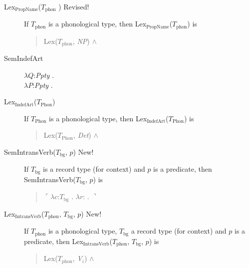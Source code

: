 \begin{description}
\item[\textnormal{Lex$_{\mathrm{PropName}}$($T_{\mathrm{phon}}$
    )} Revised!] \mbox{}

  If $T_{\mathrm{phon}}$ is a phonological type,
  then Lex$_{\mathrm{PropName}}$($T_{\mathrm{phon}}$) is
  \begin{quote}
    Lex($T_{\mathrm{phon}}$, \textit{NP}) \d{$\wedge$}
  \end{quote}

  
\item[\textnormal{SemIndefArt}] \mbox{}

  $\lambda Q$:\textit{Ppty} . \\
\hspace*{1em} $\lambda P$:\textit{Ppty}
. 

        
      \item[\textnormal{Lex$_{\mathrm{IndefArt}}$($T_{\mathrm{Phon}}$)}]
        \mbox{}

        If $T_{\mathrm{Phon}}$ is a phonological type, then
        Lex$_{\mathrm{IndefArt}}$($T_{\mathrm{Phon}}$) is
        \begin{quote}
          Lex($T_{\mathrm{Phon}}$, \textit{Det}) \d{$\wedge$}
        \end{quote}
        
      \item[\textnormal{SemIntransVerb($T_{\mathrm{bg}}$, $p$)} New!]
        \mbox{}

        If $T_{\text{bg}}$ is a record type (for context) and $p$ is a
        predicate, then SemIntransVerb($T_{\mathrm{bg}}$, $p$) is
        \begin{quote}
          $\ulcorner\lambda c$:$T_{\mathrm{bg}}$ . $\lambda
          r$:
          . $\urcorner$
        \end{quote}

        
      \item[\textnormal{Lex$_{\mathrm{IntransVerb}}$($T_{\mathrm{phon}}$,
          $T_{\mathrm{bg}}$, $p$)} New!] \mbox{}

        If $T_{\mathrm{phon}}$ is a phonological type,
        $T_{\mathrm{bg}}$ a record type (for context) and $p$ is a
        predicate, then Lex$_{\mathrm{IntransVerb}}$($T_{\mathrm{phon}}$,
        $T_{\mathrm{bg}}$, $p$) is
        \begin{quote}
          Lex($T_{\mathrm{phon}}$, \textit{V$_i$}) \d{$\wedge$}
        \end{quote}
        


\end{description}
